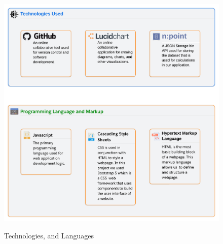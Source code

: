 \documentclass[12pt]{article}
\begin{document}
\begin{figure}[H]
\caption{Technologies, and Languages}
\centering
\includegraphics[scale=.25]{figures/Technologies Used.png}\\
\end{figure}
\end{document}
